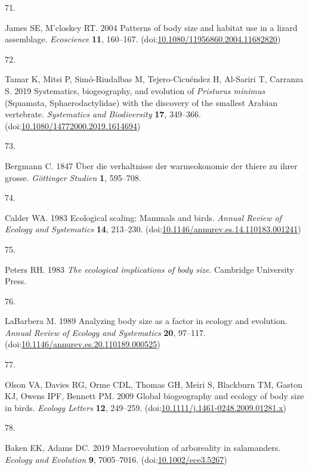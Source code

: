 \documentclass[
  11pt,
]{article}
\newlength{\cslhangindent}
\newlength{\csllabelwidth}
\newlength{\cslentryspacingunit} %
\newenvironment{CSLReferences}[2] %
 {%
  \setlength{\parindent}{0pt}
  \ifodd #1
  \let\oldpar\par
  \def\par{\hangindent=\cslhangindent\oldpar}
  \fi
  \setlength{\parskip}{#2\cslentryspacingunit}
 }%
 {}
\newcommand{\CSLLeftMargin}[1]{\parbox[t]{\csllabelwidth}{#1}}
\newcommand{\CSLRightInline}[1]{\parbox[t]{\linewidth - \csllabelwidth}{#1}\break}
\begin{document}
\begin{CSLReferences}{0}{0}
\leavevmode{}%
\CSLLeftMargin{71. }%
\CSLRightInline{James SE, M'closkey RT. 2004 Patterns of body size and
habitat use in a lizard assemblage. \emph{Ecoscience} \textbf{11},
160--167.
(doi:\href{https://doi.org/10.1080/11956860.2004.11682820}{10.1080/11956860.2004.11682820})}

\leavevmode{}%
\CSLLeftMargin{72. }%
\CSLRightInline{Tamar K, Mitsi P, Simó-Riudalbas M, Tejero-Cicuéndez H,
Al-Sariri T, Carranza S. 2019 Systematics, biogeography, and evolution
of \emph{{P}risturus minimus} ({S}quamata, {S}phaerodactylidae) with the
discovery of the smallest {A}rabian vertebrate. \emph{Systematics and
Biodiversity} \textbf{17}, 349--366.
(doi:\href{https://doi.org/10.1080/14772000.2019.1614694}{10.1080/14772000.2019.1614694})}

\leavevmode{}%
\CSLLeftMargin{73. }%
\CSLRightInline{Bergmann C. 1847 {Ü}ber die verhaltnisse der
warmeokonomie der thiere zu ihrer grosse. \emph{G{ö}ttinger Studien}
\textbf{1}, 595--708.}

\leavevmode{}%
\CSLLeftMargin{74. }%
\CSLRightInline{Calder WA. 1983 Ecological scaling: Mammals and birds.
\emph{Annual Review of Ecology and Systematics} \textbf{14}, 213--230.
(doi:\href{https://doi.org/10.1146/annurev.es.14.110183.001241}{10.1146/annurev.es.14.110183.001241})}

\leavevmode{}%
\CSLLeftMargin{75. }%
\CSLRightInline{Peters RH. 1983 \emph{The ecological implications of
body size}. Cambridge University Press. }

\leavevmode{}%
\CSLLeftMargin{76. }%
\CSLRightInline{LaBarbera M. 1989 Analyzing body size as a factor in
ecology and evolution. \emph{Annual Review of Ecology and Systematics}
\textbf{20}, 97--117.
(doi:\href{https://doi.org/10.1146/annurev.es.20.110189.000525}{10.1146/annurev.es.20.110189.000525})}

\leavevmode{}%
\CSLLeftMargin{77. }%
\CSLRightInline{Olson VA, Davies RG, Orme CDL, Thomas GH, Meiri S,
Blackburn TM, Gaston KJ, Owens IPF, Bennett PM. 2009 Global biogeography
and ecology of body size in birds. \emph{Ecology Letters} \textbf{12},
249--259.
(doi:\href{https://doi.org/10.1111/j.1461-0248.2009.01281.x}{10.1111/j.1461-0248.2009.01281.x})}

\leavevmode{}%
\CSLLeftMargin{78. }%
\CSLRightInline{Baken EK, Adams DC. 2019 Macroevolution of arboreality
in salamanders. \emph{Ecology and Evolution} \textbf{9}, 7005--7016.
(doi:\href{https://doi.org/10.1002/ece3.5267}{10.1002/ece3.5267})}


\end{CSLReferences}
\end{document}
